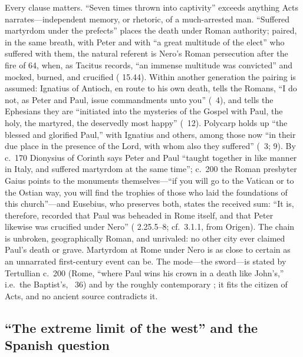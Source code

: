 Every clause matters. ``Seven times thrown into captivity'' exceeds
anything Acts narrates---independent memory, or rhetoric, of a much-arrested man.
``Suffered martyrdom under the prefects'' places the death under Roman
authority; paired, in the same breath, with Peter and with ``a great
multitude of the elect'' who suffered with them, the natural referent is
Nero's Roman persecution after the fire of 64, when, as Tacitus records,
``an immense multitude was convicted'' and mocked, burned, and crucified
( 15.44). Within another generation the pairing is assumed:
Ignatius of Antioch, en route to his own death, tells the Romans, ``I do
not, as Peter and Paul, issue commandments unto you'' (~4),
and tells the Ephesians they are ``initiated into the mysteries of the
Gospel with Paul, the holy, the martyred, the deservedly most happy''
(~12). Polycarp holds up ``the blessed and glorified
Paul,'' with Ignatius and others, among those now ``in their due place in
the presence of the Lord, with whom also they suffered''
(~3; 9). By c.~170 Dionysius of Corinth says Peter and
Paul ``taught together in like manner in Italy, and suffered martyrdom at
the same time''; c.~200 the Roman presbyter Gaius points to the monuments
themselves---``if you will go to the Vatican or to the Ostian way, you
will find the trophies of those who laid the foundations of this
church''---and Eusebius, who preserves both, states the received sum:
``It is, therefore, recorded that Paul was beheaded in Rome itself, and
that Peter likewise was crucified under Nero'' (
2.25.5--8; cf.\ 3.1.1, from Origen). The chain is unbroken, geographically
Roman, and unrivaled: no other city ever claimed Paul's death or grave.
Martyrdom at Rome under Nero is as close to certain as an unnarrated
first-century event can be. The mode---the sword---is stated by
Tertullian c.~200 (Rome, ``where Paul wins his crown in a death like
John's,'' i.e.\ the Baptist's, ~36) and by the roughly
contemporary ; it fits the citizen of Acts, and no
ancient source contradicts it.

\subsection{``The extreme limit of the west'' and the Spanish question}

